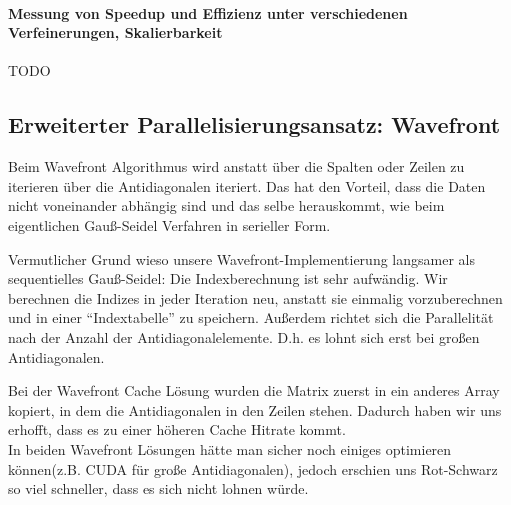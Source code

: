 \documentclass{article}
\begin{document}
\paragraph{Messung von Speedup und Effizienz unter verschiedenen Verfeinerungen, Skalierbarkeit} 
TODO

\subsection{Erweiterter Parallelisierungsansatz: Wavefront}
Beim Wavefront Algorithmus wird anstatt über die Spalten oder Zeilen zu iterieren über die Antidiagonalen iteriert. Das hat den Vorteil, dass die Daten nicht voneinander abhängig sind und das selbe herauskommt, wie beim eigentlichen Gauß-Seidel Verfahren in serieller Form.

Vermutlicher Grund wieso unsere Wavefront-Implementierung langsamer als sequentielles Gauß-Seidel: Die Indexberechnung ist sehr aufwändig. Wir berechnen  die Indizes in jeder Iteration neu, anstatt sie einmalig vorzuberechnen und in einer ``Indextabelle'' zu speichern. Außerdem richtet sich die Parallelität nach der Anzahl der Antidiagonalelemente. D.h. es lohnt sich erst bei großen Antidiagonalen.

Bei der Wavefront Cache Lösung wurden die Matrix zuerst in ein anderes Array kopiert, in dem die Antidiagonalen in den Zeilen stehen. Dadurch haben wir uns erhofft, dass es zu einer höheren Cache Hitrate kommt. \\
In beiden Wavefront Lösungen hätte man sicher noch einiges optimieren können(z.B. CUDA für große Antidiagonalen), jedoch erschien uns Rot-Schwarz so viel schneller, dass es sich nicht lohnen würde.
\end{document}
